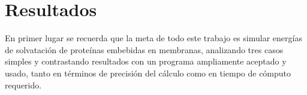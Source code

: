 \documentclass[12pt, notitlepage]{article}
\numberwithin{equation}{section}
\begin{document}
%














\section{Resultados}
En primer lugar se recuerda que la meta de todo este trabajo es simular energías de solvatación de proteínas embebidas en membranas, analizando tres casos simples y contrastando resultados con un programa ampliamente aceptado y usado, tanto en términos de precisión del cálculo como en tiempo de cómputo requerido.
\end{document}
